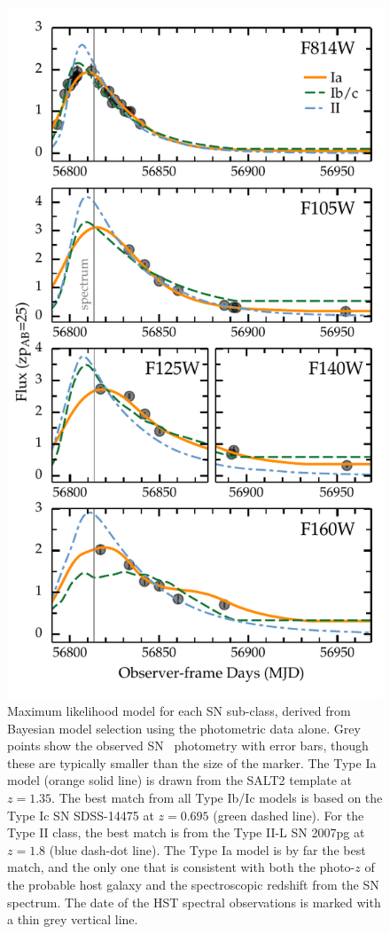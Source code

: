 \begin{figure}
\begin{center}
\includegraphics[width=\columnwidth]{FIG/snTomas_lightcurve_classification}
\caption{ 
Maximum likelihood model for each SN sub-class, derived from Bayesian
model selection using the photometric data alone. Grey points show the
observed SN \tomas\ photometry with error bars, though these are
typically smaller than the size of the marker.  The Type Ia model
(orange solid line) is drawn from the SALT2 template at $z=1.35$. The
best match from all Type Ib/Ic models is based on the Type Ic SN
SDSS-14475 at $z=0.695$ (green dashed line). For the Type II class,
the best match is from the Type II-L SN 2007pg at $z=1.8$ (blue
dash-dot line). The Type Ia model is by far the best match, and the
only one that is consistent with both the photo-$z$ of the probable
host galaxy and the spectroscopic redshift from the SN spectrum.  The
date of the HST spectral observations is marked with a thin grey
vertical line.
\label{fig:photoclass} }
\end{center}
\end{figure}

